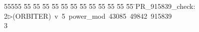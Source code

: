 %
%
\begin{tabbing}
55555 \= 55 \= 55 \= 55 \= 55 \= 55 \= 55 \= 55 \= 55 \= 55 \= 55 \= 55 \= 55 \= \>PR\_915839\_check:\\[0pt]
2\>$\triangleright$\>(ORBITER)\ v\ 5\ power\_mod\ 43085\ 49842\ 915839\\[0pt]
3\>\end{tabbing}
